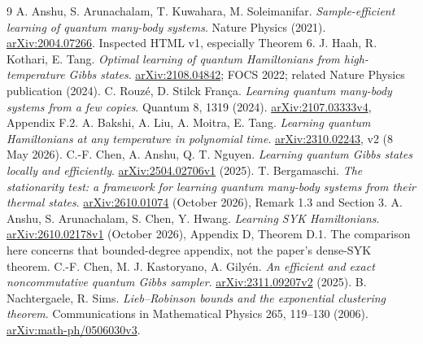 \documentclass[11pt]{article}
\theoremstyle{remark}\newtheorem{remark}[theorem]{Remark}
\begin{document}
\begingroup\small
\begin{thebibliography}{9}
 A. Anshu, S. Arunachalam, T. Kuwahara, M. Soleimanifar.
\emph{Sample-efficient learning of quantum many-body systems}. Nature Physics (2021). \href{https://arxiv.org/abs/2004.07266}{arXiv:2004.07266}. Inspected HTML v1, especially Theorem 6.
 J. Haah, R. Kothari, E. Tang.
\emph{Optimal learning of quantum Hamiltonians from high-temperature Gibbs states}. \href{https://arxiv.org/abs/2108.04842}{arXiv:2108.04842}; FOCS 2022; related Nature Physics publication (2024).
 C. Rouz\'e, D. Stilck Fran\c ca.
\emph{Learning quantum many-body systems from a few copies}. Quantum 8, 1319 (2024). \href{https://arxiv.org/abs/2107.03333}{arXiv:2107.03333v4}, Appendix F.2.
 A. Bakshi, A. Liu, A. Moitra, E. Tang.
\emph{Learning quantum Hamiltonians at any temperature in polynomial time}. \href{https://arxiv.org/abs/2310.02243}{arXiv:2310.02243}, v2 (8 May 2026).
 C.-F. Chen, A. Anshu, Q. T. Nguyen.
\emph{Learning quantum Gibbs states locally and efficiently}. \href{https://arxiv.org/abs/2504.02706}{arXiv:2504.02706v1} (2025).
 T. Bergamaschi.
\emph{The stationarity test: a framework for learning quantum many-body systems from their thermal states}. \href{https://arxiv.org/abs/2610.01074}{arXiv:2610.01074} (October 2026), Remark 1.3 and Section 3.
 A. Anshu, S. Arunachalam, S. Chen, Y. Hwang.
\emph{Learning SYK Hamiltonians}. \href{https://arxiv.org/abs/2610.02178}{arXiv:2610.02178v1} (October 2026), Appendix D, Theorem D.1. The comparison here concerns that bounded-degree appendix, not the paper's dense-SYK theorem.
 C.-F. Chen, M. J. Kastoryano, A. Gily\'en.
\emph{An efficient and exact noncommutative quantum Gibbs sampler}.
\href{https://arxiv.org/abs/2311.09207}{arXiv:2311.09207v2} (2025).
 B. Nachtergaele, R. Sims.
\emph{Lieb--Robinson bounds and the exponential clustering theorem}.
Communications in Mathematical Physics 265, 119--130 (2006).
\href{https://arxiv.org/abs/math-ph/0506030}{arXiv:math-ph/0506030v3}.
\end{thebibliography}
\endgroup
\end{document}
